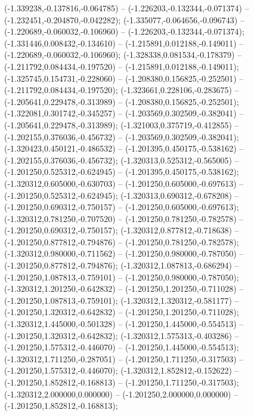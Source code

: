  (-1.339238,-0.137816,-0.064785) -- (-1.226203,-0.132344,-0.071374) -- (-1.232451,-0.204870,-0.042282);
 (-1.335077,-0.064656,-0.096743) -- (-1.220689,-0.060032,-0.106960) -- (-1.226203,-0.132344,-0.071374);
 (-1.331446,0.008432,-0.134610) -- (-1.215891,0.012188,-0.149011) -- (-1.220689,-0.060032,-0.106960);
 (-1.328338,0.081534,-0.178379) -- (-1.211792,0.084434,-0.197520) -- (-1.215891,0.012188,-0.149011);
 (-1.325745,0.154731,-0.228060) -- (-1.208380,0.156825,-0.252501) -- (-1.211792,0.084434,-0.197520);
 (-1.323661,0.228106,-0.283675) -- (-1.205641,0.229478,-0.313989) -- (-1.208380,0.156825,-0.252501);
 (-1.322081,0.301742,-0.345257) -- (-1.203569,0.302509,-0.382041) -- (-1.205641,0.229478,-0.313989);
 (-1.321003,0.375719,-0.412855) -- (-1.202155,0.376036,-0.456732) -- (-1.203569,0.302509,-0.382041);
 (-1.320423,0.450121,-0.486532) -- (-1.201395,0.450175,-0.538162) -- (-1.202155,0.376036,-0.456732);
 (-1.320313,0.525312,-0.565005) -- (-1.201250,0.525312,-0.624945) -- (-1.201395,0.450175,-0.538162);
 (-1.320312,0.605000,-0.630703) -- (-1.201250,0.605000,-0.697613) -- (-1.201250,0.525312,-0.624945);
 (-1.320313,0.690312,-0.678208) -- (-1.201250,0.690312,-0.750157) -- (-1.201250,0.605000,-0.697613);
 (-1.320312,0.781250,-0.707520) -- (-1.201250,0.781250,-0.782578) -- (-1.201250,0.690312,-0.750157);
 (-1.320312,0.877812,-0.718638) -- (-1.201250,0.877812,-0.794876) -- (-1.201250,0.781250,-0.782578);
 (-1.320312,0.980000,-0.711562) -- (-1.201250,0.980000,-0.787050) -- (-1.201250,0.877812,-0.794876);
 (-1.320312,1.087813,-0.686294) -- (-1.201250,1.087813,-0.759101) -- (-1.201250,0.980000,-0.787050);
 (-1.320312,1.201250,-0.642832) -- (-1.201250,1.201250,-0.711028) -- (-1.201250,1.087813,-0.759101);
 (-1.320312,1.320312,-0.581177) -- (-1.201250,1.320312,-0.642832) -- (-1.201250,1.201250,-0.711028);
 (-1.320312,1.445000,-0.501328) -- (-1.201250,1.445000,-0.554513) -- (-1.201250,1.320312,-0.642832);
 (-1.320312,1.575313,-0.403286) -- (-1.201250,1.575312,-0.446070) -- (-1.201250,1.445000,-0.554513);
 (-1.320312,1.711250,-0.287051) -- (-1.201250,1.711250,-0.317503) -- (-1.201250,1.575312,-0.446070);
 (-1.320312,1.852812,-0.152622) -- (-1.201250,1.852812,-0.168813) -- (-1.201250,1.711250,-0.317503);
 (-1.320312,2.000000,0.000000) -- (-1.201250,2.000000,0.000000) -- (-1.201250,1.852812,-0.168813);
